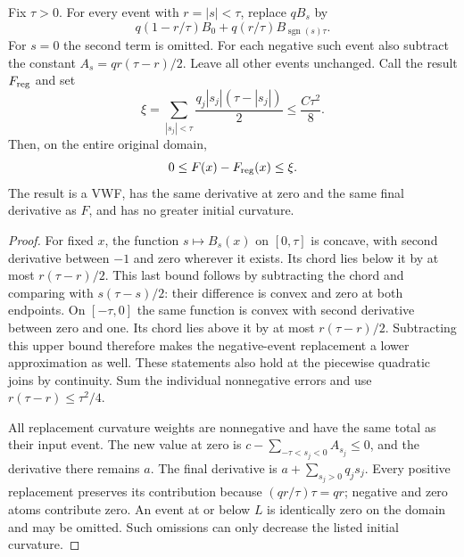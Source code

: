 \begin{lemma}
\label{lem:op3-vwf-moment-regularization}
Fix $\tau>0$. For every event with $r=|s|<\tau$, replace $qB_s$ by
\[
 q(1-r/\tau)B_0+q(r/\tau)B_{\operatorname{sgn}(s)\tau}.
\]
For $s=0$ the second term is omitted. For each negative such event also
subtract the constant $A_s=qr(\tau-r)/2$. Leave all other events unchanged.
Call the result $F_{\rm reg}$ and set
\begin{equation}
 \xi=\sum_{|s_j|<\tau}\frac{q_j|s_j|(\tau-|s_j|)}2
 \leq \frac{C\tau^2}{8}.
 \label{eq:op3-global-regularization-error}
\end{equation}
Then, on the entire original domain,
\[
 0\leq F(x)-F_{\rm reg}(x)\leq\xi.
\]
The result is a VWF, has the same derivative at zero and the same final
derivative as $F$, and has no greater initial curvature.
\end{lemma}
\begin{proof}
For fixed $x$, the function $s\mapsto B_s(x)$ on $[0,\tau]$ is concave,
with second derivative between $-1$ and zero wherever it exists. Its chord
lies below it by at most $r(\tau-r)/2$. This last bound follows by
subtracting the chord and comparing with $s(\tau-s)/2$: their difference
is convex and zero at both endpoints. On $[-\tau,0]$ the same function
is convex with second derivative between zero and one. Its chord lies
above it by at most $r(\tau-r)/2$. Subtracting this upper bound therefore
makes the negative-event replacement a lower approximation as well.
These statements also hold at the piecewise quadratic joins by continuity.
Sum the individual nonnegative errors and use $r(\tau-r)\leq\tau^2/4$.

All replacement curvature weights are nonnegative and have the same total
as their input event. The new value at zero is
$c-\sum_{-\tau<s_j<0}A_{s_j}\leq0$, and the derivative there remains $a$.
The final derivative is $a+\sum_{s_j>0}q_js_j$. Every positive replacement
preserves its contribution because $(qr/\tau)\tau=qr$; negative and zero
atoms contribute zero. An event at or below $L$ is identically zero on
the domain and may be omitted. Such omissions can only decrease the
listed initial curvature.
\end{proof}

